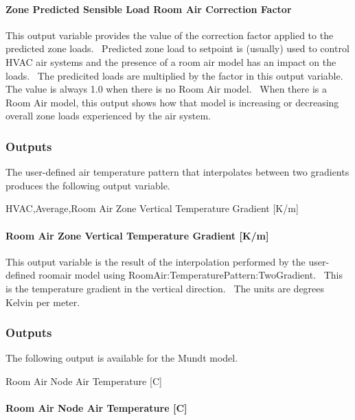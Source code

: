 \paragraph{Zone Predicted Sensible Load Room Air Correction Factor}\label{zone-predicted-sensible-load-room-air-correction-factor}

This output variable provides the value of the correction factor applied to the predicted zone loads.~ Predicted zone load to setpoint is (usually) used to control HVAC air systems and the presence of a room air model has an impact on the loads.~ The predicited loads are multiplied by the factor in this output variable.~ The value is always 1.0 when there is no Room Air model.~ When there is a Room Air model, this output shows how that model is increasing or decreasing overall zone loads experienced by the air system.

\subsubsection{Outputs}\label{outputs-2-019}

The user-defined air temperature pattern that interpolates between two gradients produces the following output variable.

HVAC,Average,Room Air Zone Vertical Temperature Gradient {[}K/m{]}

\paragraph{Room Air Zone Vertical Temperature Gradient {[}K/m{]}}\label{room-air-zone-vertical-temperature-gradient-km}

This output variable is the result of the interpolation performed by the user-defined roomair model using RoomAir:TemperaturePattern:TwoGradient.~ This is the temperature gradient in the vertical direction.~ The units are degrees Kelvin per meter.

\subsubsection{Outputs}\label{outputs-3-017}

The following output is available for the Mundt model.

Room Air Node Air Temperature {[}C{]}

\paragraph{Room Air Node Air Temperature {[}C{]}}\label{room-air-node-air-temperature-c}

